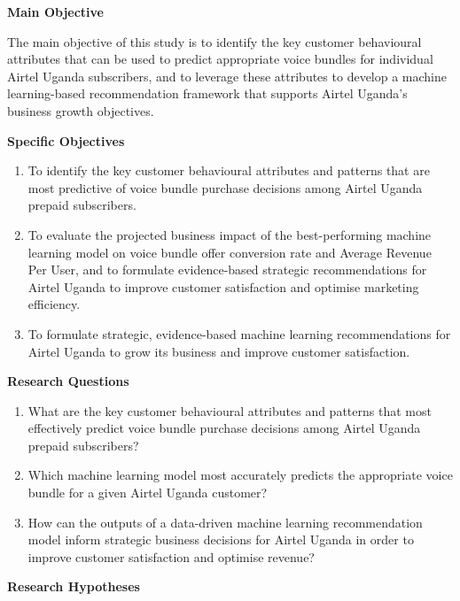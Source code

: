 \textbf{Main Objective}

The main objective of this study is to identify the key customer behavioural attributes that can be used to predict appropriate voice bundles for individual Airtel Uganda subscribers, and to leverage these attributes to develop a machine learning-based recommendation framework that supports Airtel Uganda's business growth objectives.

\vspace{0.3cm}
\textbf{Specific Objectives}

\begin{enumerate}
    \item To identify the key customer behavioural attributes and patterns that are most predictive of voice bundle purchase decisions among Airtel Uganda prepaid subscribers.

    \item To evaluate the projected business impact of the best-performing machine learning model on voice bundle offer conversion rate and Average Revenue Per User, and to formulate evidence-based strategic recommendations for Airtel Uganda to improve customer satisfaction and optimise marketing efficiency.
    
    \item To formulate strategic, evidence-based machine learning recommendations for Airtel Uganda to grow its business and improve customer satisfaction.
\end{enumerate}

\vspace{0.3cm}
\textbf{Research Questions}

\begin{enumerate}
    \item What are the key customer behavioural attributes and patterns that most effectively predict voice bundle purchase decisions among Airtel Uganda prepaid subscribers?

    \item Which machine learning model most accurately predicts the appropriate voice bundle for a given Airtel Uganda customer?

    \item How can the outputs of a data-driven machine learning recommendation model inform strategic business decisions for Airtel Uganda in order to improve customer satisfaction and optimise revenue?
\end{enumerate}

\vspace{0.3cm}
\textbf{Research Hypotheses}

